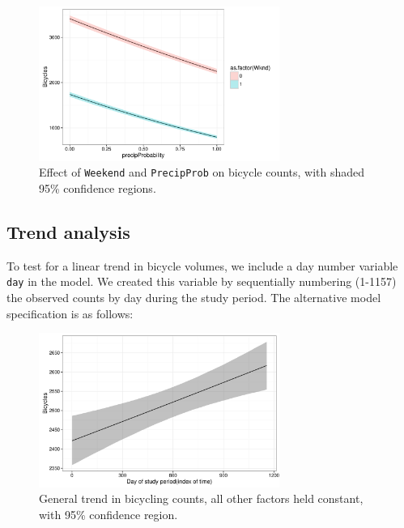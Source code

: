\documentclass [11pt, proquest] {uwthesis}[2015/03/03]
\begin{document}
\begin{figure}
\centering
   \includegraphics[width=0.7\textwidth]{figures/sim/interact} 
  \caption{Effect of \texttt{Weekend} and \texttt{PrecipProb} on bicycle counts, with shaded 95\% confidence regions.}
  \label{fig:interact}
\end{figure}

\subsection{Trend analysis}
To test for a linear trend in bicycle volumes, we include a day number variable \texttt{day} in the model. We created this variable by sequentially numbering (1-1157) the observed counts by day during the study period. The alternative model specification is as follows:

\begin{figure}
\centering
   \includegraphics[width=0.7\textwidth]{figures/sim/trend} 
  \caption{General trend in bicycling counts, all other factors held constant, with 95\% confidence region.}
  \label{fig:trend}
\end{figure}
\end{document}
